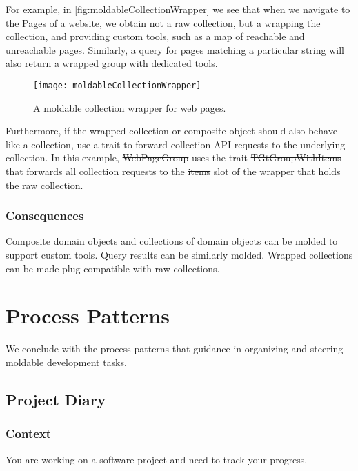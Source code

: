 \documentclass[sigconf]{acmart}
\begin{document}
For example, in \autoref{fig:moldableCollectionWrapper} we see that when we navigate to the \st{Pages} of a website, we obtain not a raw collection, but a  wrapping the collection, and providing custom tools, such as a map of reachable and unreachable pages.
Similarly, a query for pages matching a particular string will also return a wrapped group with dedicated tools.

\begin{figure}[h]
  \texttt{[image: moldableCollectionWrapper]}
  \caption{A moldable collection wrapper for web pages.}
  \label{fig:moldableCollectionWrapper}
\end{figure}

Furthermore, if the wrapped collection or composite object should also behave like a collection, use a trait to forward collection API requests to the underlying collection.
In this example, \st{WebPageGroup} uses the trait \st{TGtGroupWithItems} that forwards all collection requests to the \st{items} slot of the wrapper that holds the raw collection.

\subsubsection*{Consequences}
Composite domain objects and collections of domain objects can be molded to support custom tools.
Query results can be similarly molded.
Wrapped collections can be made plug-compatible with raw collections.

\section{Process Patterns}\label{sec:process}

We conclude with the process patterns that guidance in organizing and steering moldable development tasks.

\subsection*{Project Diary}\label{pat:projectDiary}

\subsubsection*{Context}
You are working on a software project and need to track your progress.
\end{document}
